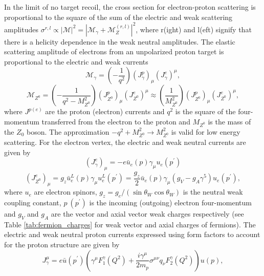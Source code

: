 In the limit of no target recoil, the cross section for electron-proton scattering is proportional to the square of the sum of the electric and weak scattering amplitudes $\sigma^{r,l}\propto\left|\mathcal{M}\right|^2=\left|\mathcal{M}_{\gamma}+\mathcal{M}_{Z}^{(r,l)}\right|^2$, where r(ight) and l(eft) signify that there is a helicity dependence in the weak neutral amplitudes. The elastic scattering amplitude of electrons from an unpolarized proton target is proportional to the electric and weak currents \cite{Perdrisat}\cite{Goldhaber}
\begin{equation}
\mathcal{M_{\gamma}}=\left(-\frac{1}{q^2}\right)(J_{\gamma}^p)_{\mu}(J_{\gamma}^e)^{\mu},
\label{eq:gamma_scattering_amplitude}
\end{equation}
\begin{equation}
\mathcal{M}_{Z^0}=\left(-\frac{1}{q^2-M_{Z^0}^2}\right)(J_{Z^0}^p)_{\mu}(J_{Z^0}^e)^{\mu}\approx\left(\frac{1}{M_{Z^0}^2}\right)(J_{Z^0}^p)_{\mu}(J_{Z^0}^e)^{\mu},
\label{eq:z_scattering_amplitude}
\end{equation}
where $J^{p(e)}$ are the proton (electron) currents and $q^2$ is the square of the four-momentum transferred from the electron to the proton and $M_{Z^0}$ is the mass of the $Z_0$ boson. The approximation $-q^2+M_{Z^0}^2\rightarrow M_{Z^0}^2$ is valid for low energy scattering. For the electron vertex, the electric and weak neutral currents are given by
\begin{equation}
(J_{\gamma}^{e})_{\mu}=-e\bar u_e(p)\gamma_{\mu}u_e(p^{\prime})
\label{eq:electron_gamma_current}
\end{equation}
\begin{equation}
(J_{Z^0}^{e})_{\mu}=g_z\bar u_e^L(p)\gamma_{\mu}u_e^L(p^{\prime})=\frac{g_z}{2}\bar u_e(p)\gamma_{\mu}(g_V-g_A\gamma^5)u_e(p^{\prime}),
\label{eq:electron_Z_current}
\end{equation}
where $u_e$ are electron spinors, $g_z=g_e/(\sin\theta_W\cos\theta_W)$ is the neutral weak coupling constant, $p~(p^{\prime})$ is the incoming (outgoing) electron four-momentum and $g_V$ and $g_A$ are the vector and axial vector weak charges respectively (see Table \ref{tab:fermion_charges} for weak vector and axial charges of fermions).
The electric and weak neutral proton currents expressed using form factors to account for the proton structure are given by
\begin{equation}
J_{\gamma}^{\mu}=e\bar u(p^{\prime})\left(\gamma^{\mu} F_1^{\gamma}(Q^2) + \frac{i\gamma^{\mu}}{2m_p}\sigma^{\mu\nu}q_{\nu} F_2^{\gamma}(Q^2)\right)u(p),
\label{eq:proton_gamma_current}
\end{equation} 
